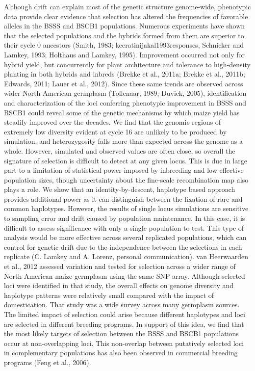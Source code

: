 Although drift can explain most of the genetic structure genome-wide, phenotypic data provide clear evidence that selection has altered the frequencies of favorable alleles in the BSSS and BSCB1 populations. 
Numerous experiments have shown that the selected populations and the hybrids formed from them are superior to their cycle 0 ancestors (Smith, 1983; keeratinijakal1993responses, Schnicker and Lamkey, 1993; Holthaus and Lamkey, 1995). Improvement occurred not only for hybrid yield, but concurrently for plant architecture and tolerance to high-density planting in both hybrids and inbreds (Brekke et al., 2011a; Brekke et al., 2011b; Edwards, 2011; Lauer et al., 2012). Since these same trends are observed across wider North American germplasm (Tollenaar, 1989; Duvick, 2005), identification and characterization of the loci conferring phenotypic improvement in BSSS and BSCB1 could reveal some of the genetic mechanisms by which maize yield has steadily improved over the decades. We find that the genomic regions of extremely low diversity evident at cycle 16 are unlikely to be produced by simulation, and heterozygosity falls more than expected across the genome as a whole.  However, simulated and observed values are often close, so overall the signature of selection is difficult to detect at any given locus. This is due in large part to a limitation of statistical power imposed by inbreeding and low effective population sizes, though uncertainty about the fine-scale recombination map also plays a role. We show that an identity-by-descent, haplotype based approach provides additional power as it can distinguish between the fixation of rare and common haplotypes. However, the results of single locus simulations are sensitive to sampling error and drift caused by population maintenance. In this case, it is difficult to assess significance with only a single population to test. This type of analysis would be more effective across several replicated populations, which can control for genetic drift due to the independence between the selections in each replicate (C. Lamkey and A. Lorenz, personal communication). 
	van Heerwaarden et al., 2012 assessed variation and tested for selection across a wider range of North American maize germplasm using the same SNP array. Although selected loci were identified in that study, the overall effects on genome diversity and haplotype patterns were relatively small compared with the impact of domestication. That study was a wide survey across many germplasm sources. The limited impact of selection could arise because different haplotypes and loci are selected in different breeding programs. In support of this idea, we find that the most likely targets of selection between the BSSS and BSCB1 populations occur at non-overlapping loci. This non-overlap between putatively selected loci in complementary populations has also been observed in commercial breeding programs (Feng et al., 2006).

